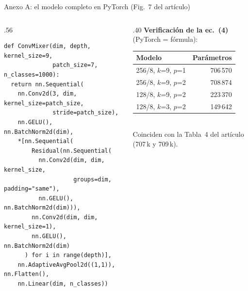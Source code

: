 \begin{frame}[fragile]{Anexo A: el modelo completo en PyTorch (Fig.~7 del artículo)}
\begin{columns}[T]
\begin{column}{.56\textwidth}
\scriptsize
\begin{verbatim}
def ConvMixer(dim, depth, kernel_size=9,
              patch_size=7, n_classes=1000):
  return nn.Sequential(
    nn.Conv2d(3, dim, kernel_size=patch_size,
              stride=patch_size),
    nn.GELU(), nn.BatchNorm2d(dim),
    *[nn.Sequential(
        Residual(nn.Sequential(
          nn.Conv2d(dim, dim, kernel_size,
                    groups=dim, padding="same"),
          nn.GELU(), nn.BatchNorm2d(dim))),
        nn.Conv2d(dim, dim, kernel_size=1),
        nn.GELU(), nn.BatchNorm2d(dim)
      ) for i in range(depth)],
    nn.AdaptiveAvgPool2d((1,1)), nn.Flatten(),
    nn.Linear(dim, n_classes))
\end{verbatim}
\end{column}
\begin{column}{.40\textwidth}
\small
\textbf{Verificación de la ec.~(4)} (PyTorch = fórmula):\\[3pt]
\begin{tabular}{lr}
\toprule
Modelo & Parámetros\\
\midrule
256/8, $k$=9, $p$=1 & 706\,570\\
256/8, $k$=9, $p$=2 & 708\,874\\
128/8, $k$=9, $p$=2 & 223\,370\\
128/8, $k$=3, $p$=2 & 149\,642\\
\bottomrule
\end{tabular}\\[4pt]
{\footnotesize Coinciden con la Tabla~4 del artículo (707\,k y 709\,k).}
\end{column}
\end{columns}
\end{frame}

